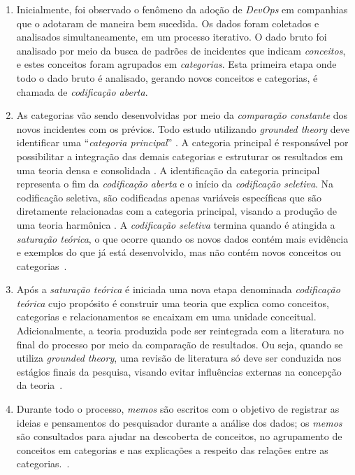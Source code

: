 \begin{enumerate}[label=(\Alph*)]

\item Inicialmente, foi observado o fenômeno da adoção de \textit{DevOps} em companhias que
o adotaram de maneira bem sucedida. Os dados foram coletados e
analisados simultaneamente, em um processo iterativo. O dado bruto foi
analisado por meio da busca de padrões de incidentes que indicam \emph{conceitos},
e estes conceitos foram agrupados em \emph{categorias}. Esta primeira etapa onde
todo o dado bruto é analisado, gerando novos conceitos e categorias, é chamada
de \emph{codificação aberta}.

\item As categorias vão sendo desenvolvidas por meio da \emph{comparação constante}
dos novos incidentes com os prévios. Todo estudo utilizando \textit{grounded theory}
deve identificar uma ``\emph{categoria principal}'' \cite{stol2016grounded}. A
categoria principal é responsável por possibilitar a integração das demais
categorias e estruturar os resultados em uma teoria densa e consolidada \cite{jantunen_using_gt_approach}.
A identificação da categoria principal representa o fim da \emph{codificação
aberta} e o início da \emph{codificação seletiva}. Na codificação seletiva,
são codificadas apenas variáveis específicas que são diretamente relacionadas
com a categoria principal, visando a produção de uma teoria harmônica \cite{using_gt_coleman,hoda_impact_inadequate}.
A \emph{codificação seletiva} termina quando é atingida a \emph{saturação
teórica}, o que ocorre quando os novos dados contém mais evidência e exemplos
do que já está desenvolvido, mas não contém novos conceitos ou categorias~\cite{glaser1967discovery}.

\item Após a \emph{saturação teórica} é iniciada uma nova etapa denominada
\emph{codificação teórica} cujo propósito é construir uma teoria que explica
como conceitos, categorias e relacionamentos se encaixam em uma unidade conceitual.
Adicionalmente, a teoria produzida pode ser reintegrada com a literatura no final
do processo por meio da comparação de resultados. Ou seja, quando se utiliza
{\it grounded theory}, uma revisão de literatura só deve ser conduzida nos
estágios finais da pesquisa, visando evitar influências externas na concepção
da teoria~\cite{reconciling_perspectives}.

\item Durante todo o processo, {\it memos} são escritos com o objetivo de
registrar as ideias e pensamentos do pesquisador durante a análise dos dados; os
{\it memos} são consultados para ajudar na descoberta de conceitos, no
agrupamento de conceitos em categorias e nas explicações a respeito das relações
entre as categorias.~\cite{reconciling_perspectives}.

\end{enumerate}

